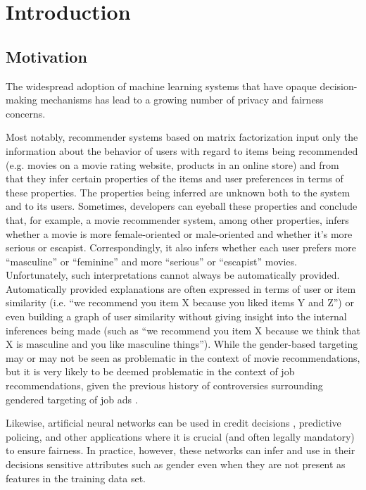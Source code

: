 \chapter{Introduction}

\section{Motivation}

The widespread adoption of machine learning systems that have opaque
decision-making mechanisms has lead to a growing number of privacy and fairness
concerns.

Most notably, recommender systems based on matrix factorization
input only the information about the behavior of users with regard to items
being recommended (e.g. movies on a movie rating website, products in an
online store) and from that they infer certain properties of the items and
user preferences in terms of these properties\cite{facebook-cf}. The properties
being inferred are unknown both to the system and to its users. Sometimes,
developers can eyeball these properties and conclude that, for example, a movie
recommender system, among other properties, infers whether a movie is more
female-oriented or male-oriented and whether it's more serious or escapist.
Correspondingly, it also infers whether each user prefers more ``masculine'' or
``feminine'' and more ``serious'' or ``escapist'' movies\cite{koren2009matrix}.
Unfortunately, such interpretations cannot always be automatically provided.
Automatically provided explanations are often expressed in terms of user or
item similarity (i.e. ``we recommend you item X because you liked items Y and
Z'') or even building a graph of user similarity\cite{hernando2013trees}
without giving insight into the internal inferences being made (such as
``we recommend you item X because we think that X is masculine and you like
masculine things''). While the gender-based targeting may or may not be seen as
problematic in the context of movie recommendations, but it is very likely to be
deemed problematic in the context of job recommendations, given the previous
history of controversies surrounding gendered targeting of job ads
\cite{datta_tschantz_datta_2015}.

Likewise, artificial neural networks can be used in credit decisions
\cite{WEST20001131}, predictive policing\cite{Seo2018PartiallyGN}, and other
applications where it is crucial (and often legally mandatory) to ensure
fairness. In practice, however, these networks can infer and use in their
decisions sensitive attributes such as gender even when they are not present
as features in the training data set\cite{Beutel2017DataDA}.

